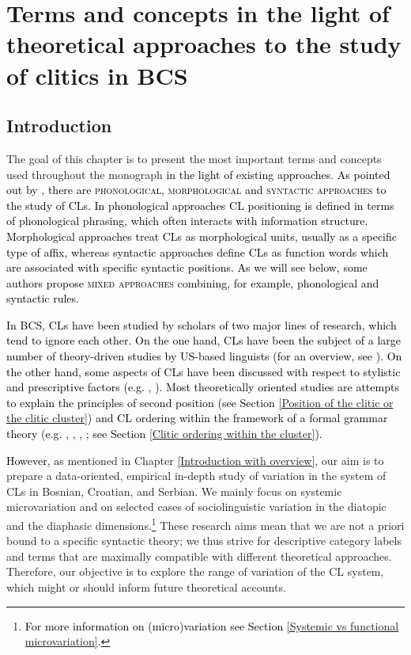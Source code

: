 \chapter[Terms and concepts in the light of theoretical approaches]
        {Terms and concepts in the light of theoretical approaches to the study of clitics in BCS}
\label{Our terms and concepts}
\label{Theoretical Aproaches to the Study of Clitics in BCS}
\section{Introduction}

The goal of this chapter is to present the most important terms and concepts used throughout the monograph \textcolor{black}{in the light of existing approaches}.  \textcolor{black}{As pointed out by \citet[233]{SpencerLuis12}, there are \textsc{phonological}, \textsc{morphological} and \textsc{syntactic approaches} to the study of CLs. In phonological approaches CL positioning is defined in terms of phonological phrasing, which often interacts with information structure. Morphological approaches treat CLs as morphological units, usually as a specific type of affix, whereas syntactic approaches define CLs as function words which are associated with specific syntactic positions. As we will see below, some authors propose \textsc{mixed approaches} combining, for example, phonological and syntactic rules.}

\textcolor{black}{
In BCS, CLs have been studied by scholars of two major lines of research, which tend to ignore each other. On the one hand, CLs have been the subject of a large number of theory-driven studies by US-based linguists (for an overview, see \citealt{Boskovic00, Boskovic04}). On the other hand, some aspects of CLs have been discussed with respect to stylistic and prescriptive factors (e.g. \citealt{Reinkowski01}, \citealt{PetiStantic07b}). Most theoretically oriented studies are attempts to explain the principles of second position (see Section  \ref{Position of the clitic or the clitic cluster}) and CL ordering within the framework of a formal grammar theory (e.g. \citealt{RadanovicKocic88, RadanovicKocic96}, \citealt{Schutze94}, \citealt{Progovac96}, \citealt{Boskovic00, Boskovic04}; see Section \ref{Clitic ordering within the cluster}).}

\textcolor{black}{However, a}s mentioned in Chapter \ref{Introduction with overview}, our aim is to prepare a data-oriented, empirical in-depth study of variation in the system of CLs in Bosnian, Croatian, and Serbian. We mainly focus on systemic microvariation and on selected cases of sociolinguistic variation in the diatopic and the diaphasic dimensions.\footnote{\textcolor{black}{For more information on (micro)variation see Section \ref{Systemic vs functional microvariation}.}} These research aims mean that we are not a priori bound to a specific syntactic theory; we thus strive for descriptive category labels and terms that are maximally compatible with different theoretical approaches. Therefore, our objective is to explore the range of variation of the CL system, which might or should inform future theoretical accounts.

